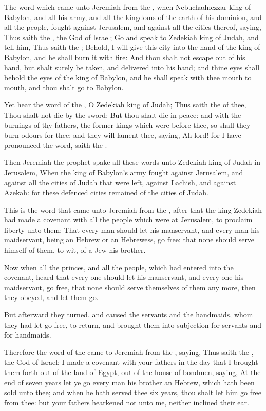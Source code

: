 \Chapter
\Verse The word which came unto Jeremiah from the \LORD, when Nebuchadnezzar king of Babylon, and all his army, and all the kingdoms of the earth of his dominion, and all the people, fought against Jerusalem, and against all the cities thereof, saying, \Verse Thus saith the \LORD, the God of Israel; Go and speak to Zedekiah king of Judah, and tell him, Thus saith the \LORD; Behold, I will give this city into the hand of the king of Babylon, and he shall burn it with fire: \Verse And thou shalt not escape out of his hand, but shalt surely be taken, and delivered into his hand; and thine eyes shall behold the eyes of the king of Babylon, and he shall speak with thee mouth to mouth, and thou shalt go to Babylon.

\Verse Yet hear the word of the \LORD, O Zedekiah king of Judah; Thus saith the \LORD of thee, Thou shalt not die by the sword: \Verse But thou shalt die in peace: and with the burnings of thy fathers, the former kings which were before thee, so shall they burn odours for thee; and they will lament thee, saying, Ah lord! for I have pronounced the word, saith the \LORD.

\Verse Then Jeremiah the prophet spake all these words unto Zedekiah king of Judah in Jerusalem, \Verse When the king of Babylon's army fought against Jerusalem, and against all the cities of Judah that were left, against Lachish, and against Azekah: for these defenced cities remained of the cities of Judah.

\Verse This is the word that came unto Jeremiah from the \LORD, after that the king Zedekiah had made a covenant with all the people which were at Jerusalem, to proclaim liberty unto them; \Verse That every man should let his manservant, and every man his maidservant, being an Hebrew or an Hebrewess, go free; that none should serve himself of them, to wit, of a Jew his brother.

\Verse Now when all the princes, and all the people, which had entered into the covenant, heard that every one should let his manservant, and every one his maidservant, go free, that none should serve themselves of them any more, then they obeyed, and let them go.

\Verse But afterward they turned, and caused the servants and the handmaids, whom they had let go free, to return, and brought them into subjection for servants and for handmaids.

\Verse Therefore the word of the \LORD came to Jeremiah from the \LORD, saying, \Verse Thus saith the \LORD, the God of Israel; I made a covenant with your fathers in the day that I brought them forth out of the land of Egypt, out of the house of bondmen, saying, \Verse At the end of seven years let ye go every man his brother an Hebrew, which hath been sold unto thee; and when he hath served thee six years, thou shalt let him go free from thee: but your fathers hearkened not unto me, neither inclined their ear.

